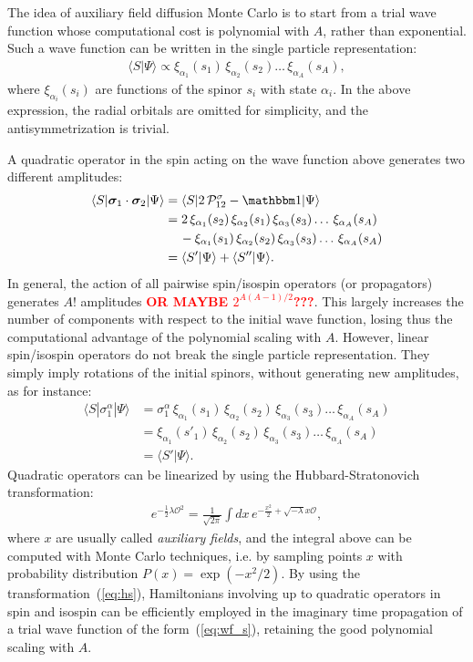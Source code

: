 \documentclass[aps,prc,twocolumn,superscriptaddress,floatfix]{revtex4-1}
\newcommand{\red}[1]{\protect\textcolor{red}{#1}}
\begin{document}
The idea of auxiliary field diffusion Monte Carlo is to start from a trial wave function
whose computational cost is polynomial with $A$, rather than exponential.
Such a wave function can be written in the single particle representation:
\begin{align}
\langle S|\Psi\rangle\propto\xi_{\alpha_1}(s_1)\,\xi_{\alpha_2}(s_2)\dots\,\xi_{\alpha_A}(s_A) ,
\label{eq:wf_s}
\end{align}
where $\xi_{\alpha_i}(s_i)$ are functions of the spinor $s_i$ with state $\alpha_i$. 
In the above expression, the radial orbitals are omitted for simplicity, 
and the antisymmetrization is trivial.

A quadratic operator in the spin acting on the wave function above generates two different amplitudes:
\begin{align}
\langle S|\bm\sigma_1\cdot\bm\sigma_2|\Psi\rangle & =\langle S|2\,\mathcal P_{12}^\sigma-\mathbbm1|\Psi\rangle \nonumber \\
& =2\,\xi_{\alpha_1}(s_2)\,\xi_{\alpha_2}(s_1)\,\xi_{\alpha_3}(s_3)\dots\,\xi_{\alpha_A}(s_A) \nonumber \\
& \quad\,-\xi_{\alpha_1}(s_1)\,\xi_{\alpha_2}(s_2)\,\xi_{\alpha_3}(s_3)\dots\,\xi_{\alpha_A}(s_A) \nonumber \\
& =\langle S'|\Psi\rangle+\langle S''|\Psi\rangle .
\end{align}
In general, the action of all pairwise spin/isospin operators (or propagators) generates $A!$ amplitudes \red{\bf OR MAYBE $2^{A(A-1)/2}$???}.
This largely increases the number of components with respect to the initial wave function, losing thus the 
computational advantage of the polynomial scaling with $A$.
However, linear spin/isospin operators do not break the single particle representation. 
They simply imply rotations of the initial spinors, without generating new amplitudes, as for instance:
\begin{align}
\langle S|\sigma_1^\alpha|\Psi\rangle &=
\sigma_1^\alpha\,\xi_{\alpha_1}(s_1)\,\xi_{\alpha_2}(s_2)\,\xi_{\alpha_3}(s_3)\dots\,\xi_{\alpha_A}(s_A) \nonumber \\
& =\xi_{\alpha_1}(s'_1)\,\xi_{\alpha_2}(s_2)\,\xi_{\alpha_3}(s_3)\dots\,\xi_{\alpha_A}(s_A) \nonumber \\
& =\langle S'|\Psi\rangle .
\end{align}
Quadratic operators can be linearized by using the Hubbard-Stratonovich transformation:
\begin{align}
e^{-\frac{1}{2}\lambda \mathcal O^2}=\frac{1}{\sqrt{2\pi}}\int dx\, e^{-\frac{x^2}{2}+\sqrt{-\lambda}x\mathcal O} ,
\label{eq:hs}
\end{align}
where $x$ are usually called \emph{auxiliary fields}, and the integral above can
be computed with Monte Carlo techniques, i.e. by sampling points $x$ with  
probability distribution $P(x)=\exp(-x^2/2)$. By using the transformation~(\ref{eq:hs}),
Hamiltonians involving up to quadratic operators in spin and isospin can be efficiently
employed in the imaginary time propagation of a trial wave function of the form~(\ref{eq:wf_s}),
retaining the good polynomial scaling with $A$.
\end{document}
